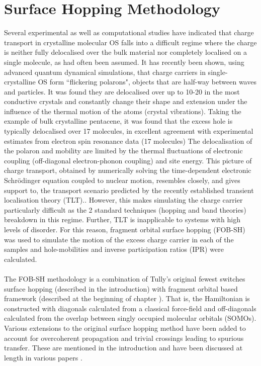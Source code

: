 \section{Surface Hopping Methodology}
Several experimental as well as computational studies have indicated that charge transport in crystalline molecular OS falls into a difficult regime where the charge is neither fully delocalised over the bulk material nor completely localised on a single molecule, as had often been assumed.\cite{Vehoff2010,Deng2004,Kwiatkowski2009,Athanasopoulos2007,Vehoff2010_2,Kordt2016,Zhang2019} It has recently been shown, using advanced quantum dynamical simulations, that charge carriers in single-crystalline OS form ``flickering polarons", objects that are half-way between waves and particles\cite{FlickPolarons,Giannini2019,Ziogos20}. It was found they are delocalised over up to 10-20 in the most conductive crystals and constantly change their shape and extension under the influence of the thermal motion of the atoms (crystal vibrations).  Taking the example of bulk crystalline pentacene, it was found that the excess hole is typically delocalised over 17 molecules, in excellent agreement with experimental estimates from electron spin resonance data (17 molecules) The delocalisation of the polaron and mobility are limited by the thermal fluctuations of electronic coupling (off-diagonal electron-phonon coupling) and site energy. This picture of charge transport, obtained by numerically solving the time-dependent electronic Schr\"odinger equation coupled to nuclear motion, resembles closely, and gives support to, the transport scenario predicted by the recently established transient localisation theory (TLT).\cite{Nematiaram2019,PhysRevB.83.081202}. However, this makes simulating the charge carrier particularly difficult as the 2 standard techniques (hopping and band theories) breakdown in this regime. Further, TLT is inapplicable to systems with high levels of disorder. For this reason, fragment orbital surface hopping (FOB-SH) was used to simulate the motion of the excess charge carrier in each of the samples and hole-mobilities and inverse participation ratios (IPR) were calculated.
\\\\
The FOB-SH methodology is a combination of Tully's original fewest switches surface hopping (described in the introduction) with fragment orbital based framework (described at the beginning of chapter \label{chap:molecular_systems}). That is, the Hamiltonian is constructed with diagonals calculated from a classical force-field and off-diagonals calculated from the overlap between singly occupied molecular orbitals (SOMOs). Various extensions to the original surface hopping method have been added to account for overcoherent propagation and trivial crossings leading to spurious transfer. These are mentioned in the introduction and have been discussed at length in various papers \cite{Giannini2018Crossover,Carof2017FSSH,C9FD00046A,C9CP04770K,C9TC05270D,FlickPolarons,FOB-SH_Spencer}.

